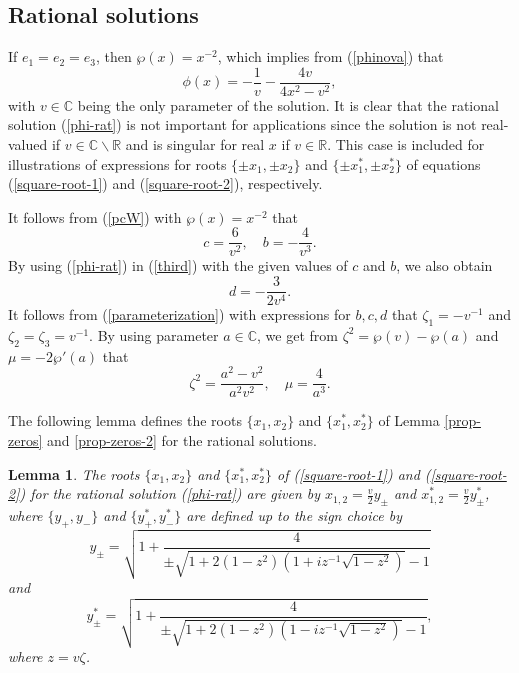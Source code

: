 \documentclass[12pt,reqno]{amsart}
\numberwithin{equation}{section}
\newtheorem{lemma}{Lemma}
\begin{document}
\subsection{Rational solutions}
\label{sec-5-1}

If $e_1 = e_2 = e_3$, then $\wp(x) = x^{-2}$, which implies from (\ref{phinova}) that 
\begin{equation}
\label{phi-rat}
\phi(x) = -\frac{1}{v} - \frac{4v}{4x^2 - v^2},
\end{equation}
with $v \in \mathbb{C}$ being the only parameter of the solution. 
It is clear that the rational solution (\ref{phi-rat}) is not important 
for applications since the solution is not real-valued if $v \in \mathbb{C}\backslash \mathbb{R}$ and is singular for real $x$ if $v \in \mathbb{R}$. This case is included for illustrations of expressions 
for roots $\{ \pm x_1,\pm x_2\}$ and $\{\pm x_1^*, \pm x_2^*\}$ 
of equations (\ref{square-root-1}) and (\ref{square-root-2}), respectively.

It follows from (\ref{pcW}) with $\wp(x) = x^{-2}$ that 
$$
c = \frac{6}{v^2}, \quad b = -\frac{4}{v^3}.
$$
By using (\ref{phi-rat}) in (\ref{third}) with the given values of $c$ and $b$, 
we also obtain 
$$
d = -\frac{3}{2v^4}.
$$
It follows from (\ref{parameterization}) with expressions for $b,c,d$ that $\zeta_1 = -v^{-1}$ and $\zeta_2 = \zeta_3 = v^{-1}$. By using parameter $a \in \mathbb{C}$, we get from $\zeta^2 = \wp(v) - \wp(a)$ and $\mu = -2 \wp'(a)$ that 
$$
\zeta^2 = \frac{a^2 - v^2}{a^2 v^2}, \quad \mu = \frac{4}{a^3}.
$$

The following lemma defines the roots $\{ x_1, x_2\}$ and $\{ x_1^*,x_2^*\}$
of Lemma \ref{prop-zeros} and \ref{prop-zeros-2} for the rational solutions. 

\begin{lemma}
	\label{lem-rational}
	The roots $\{ x_1, x_2\}$ and $\{ x_1^*,x_2^*\}$ of (\ref{square-root-1}) and (\ref{square-root-2}) for the rational solution (\ref{phi-rat}) are given by 
	$x_{1,2} = \frac{v}{2} y_{\pm}$ and $x_{1,2}^* = \frac{v}{2} y_{\pm}^*$, where 
	$\{ y_+, y_-\}$ and $\{ y_+^*, y_-^*\}$ are defined up to the sign choice by 
	\begin{equation}
	\label{y1-2}
	y_{\pm} = \sqrt{1 + \frac{4}{\pm \sqrt{1 + 2 (1-z^2) (1 + i z^{-1} \sqrt{1-z^2})}-1}}
	\end{equation}
	and
	\begin{equation}
	\label{y1-2-star}
	y_{\pm}^* = \sqrt{1 + \frac{4}{\pm \sqrt{1 + 2 (1-z^2) (1 - i z^{-1} \sqrt{1-z^2})}-1}},
	\end{equation}
	where $z = v \zeta$.
\end{lemma}
\end{document}
